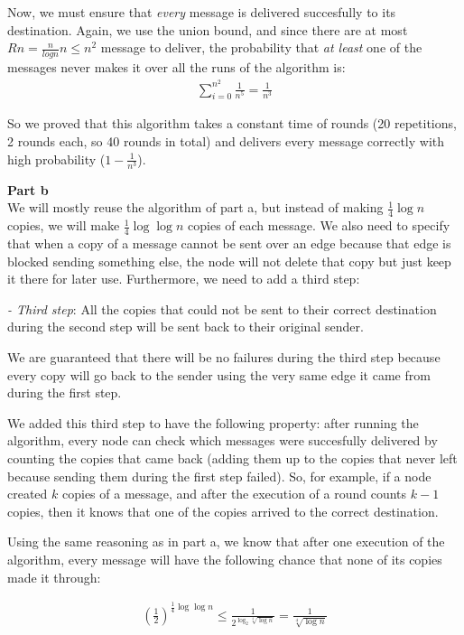 \documentclass[a4paper,german]{article}
\begin{document}
Now, we must ensure that \emph{every} message is delivered succesfully to its
destination. Again, we use the union bound, and since there are at most $Rn =
\frac{n}{log n} n \leq n^2$ message to deliver, the probability that \emph{at
least} one of the messages never makes it over all the runs of the algorithm
is:
\begin{align*}
	\sum_{i=0}^{n^2} \frac{1 }{n^5} = \frac{ 1 }{n^3}
\end{align*}

So we proved that this algorithm takes a constant time of rounds (20 repetitions, 2 rounds each, so 40 rounds in total) and
delivers every message correctly with high probability ($ 1 - \frac{ 1 }{n^3}$).



\vspace{1em}
\noindent 
\textbf{Part b} \\

We will mostly reuse the algorithm of part a, but instead of making $ \frac{1}
{4}\log n$ copies, we will make $ \frac{1} {4}\log \log n$ copies of each
message. We also need to specify that when a copy of a message cannot be sent
over an edge because that edge is blocked sending something else, the node
will not delete that copy but just keep it there for later use. Furthermore,
we need to add a third step:

\emph{- Third step}: All the copies that could not be sent to their correct destination during the second step will be sent back to their original sender. 

We are guaranteed that there will be no failures during the third step because every copy will go back to the sender using the very same edge it came from during the first step.

We added this third step to have the following property: after running the
algorithm, every node can check which messages were succesfully delivered by
counting the copies that came back (adding them up to the copies that never
left because sending them during the first step failed). So, for example, if a
node created $k$ copies of a message, and after the execution of a round
counts $k-1$ copies, then it knows that one of the copies arrived to the
correct destination.

Using the same reasoning as in part a, we know that after one execution
of the algorithm, every message will have the following chance that none of
its copies made it through:

\begin{align*}
\left( \frac{1}{2} \right)^{ \frac{1}{4}\log \log n} \leq
\frac{1}{2^{\log_2  \sqrt[4]{\log n}}} =
\frac{1}{\sqrt[4]{\log n}}
\end{align*}
\end{document}

